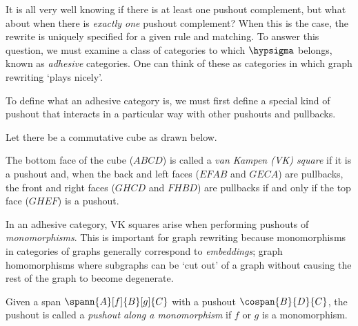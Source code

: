 It is all very well knowing if there is at least one pushout complement, but
what about when there is \emph{exactly one} pushout complement?
When this is the case, the rewrite is uniquely specified for a given rule and
matching.
To answer this question, we must examine a class of categories to which
\(\hypsigma\) belongs, known as \emph{adhesive} categories.
One can think of these as categories in which graph rewriting `plays nicely'.

To define what an adhesive category is, we must first define a special kind of
pushout that interacts in a particular way with other pushouts and pullbacks.

\begin{definition}
    Let there be a commutative cube as drawn below.
    \begin{center}
    \end{center}
    The bottom face of the cube (\(ABCD\)) is called a
    \emph{van Kampen (VK) square} if it is a pushout and, when the back and
    left faces (\(EFAB\) and \(GECA\)) are pullbacks, the front and right faces
    (\(GHCD\) and \(FHBD\)) are pullbacks if and only if the top face (\(GHEF\))
    is a pushout.
\end{definition}

In an adhesive category, VK squares arise when performing pushouts of
\emph{monomorphisms}.
This is important for graph rewriting because monomorphisms in categories of
graphs generally correspond to \emph{embeddings}; graph homomorphisms where
subgraphs can be `cut out' of a graph without causing the rest of the graph to
become degenerate.

\begin{definition}
    Given a span \(\spann{A}[f]{B}[g]{C}\) with a pushout \(\cospan{B}{D}{C}\),
    the pushout is called a \emph{pushout along a monomorphism} if \(f\) or
    \(g\) is a monomorphism.
\end{definition}

